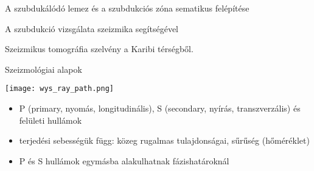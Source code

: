 \begin{frame}{A szubdukálódó lemez és a szubdukciós zóna sematikus felépítése}
    \begin{minic}{0.825}
    \end{minic}
\end{frame}

\begin{frame}{A szubdukció vizsgálata szeizmika segítségével}
    \begin{minipage}[c]{0.45\textwidth}
        \centering
    \end{minipage}
    \hspace{10pt}
    \begin{minipage}[c]{0.45\textwidth}
        \centering
        
        Szeizmikus tomográfia szelvény a Karibi térségből.
    \end{minipage}
\end{frame}


\begin{frame}{Szeizmológiai alapok}
    \begin{minipage}[c]{0.45\textwidth}
        \begin{center}
            \texttt{[image: wys\_ray\_path.png]}
            
        \end{center}
    \end{minipage}
    \begin{minipage}[c]{0.45\textwidth}
        \begin{itemize}
            \item P (primary, nyomás, longitudinális), S (secondary, nyírás, transzverzális) és felületi hullámok
            \item terjedési sebességük függ: közeg rugalmas tulajdonságai, sűrűség (hőméréklet)
            \item P és S hullámok egymásba alakulhatnak fázishatároknál
        \end{itemize}
        \cite{wysession}
    \end{minipage}
\end{frame}


